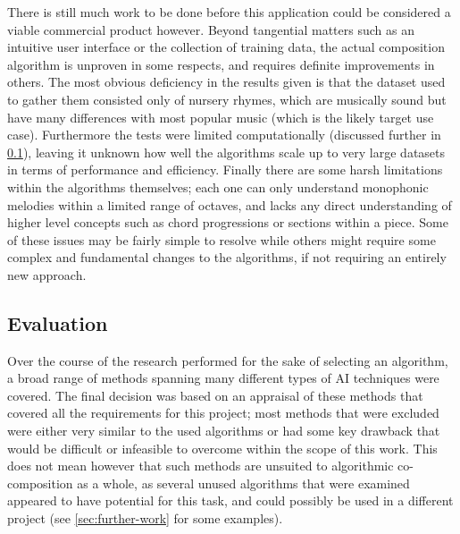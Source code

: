 \documentclass[ author={Stephen Livermore-Tozer},
				supervisor={Dr. Peter Flach},
				degree={MEng},
				title={Algorithmic Co-composition Using Machine Learning},
				subtitle={},
				type={research},
				year={2016} ]{dissertation}
\begin{document}
	There is still much work to be done before this application could be considered a viable commercial product however. Beyond tangential matters such as an intuitive user interface or the collection of training data, the actual composition algorithm is unproven in some respects, and requires definite improvements in others. The most obvious deficiency in the results given is that the dataset used to gather them consisted only of nursery rhymes, which are musically sound but have many differences with most popular music (which is the likely target use case). Furthermore the tests were limited computationally (discussed further in \ref{sec:project-evaluation}), leaving it unknown how well the algorithms scale up to very large datasets in terms of performance and efficiency. Finally there are some harsh limitations within the algorithms themselves; each one can only understand monophonic melodies within a limited range of octaves, and lacks any direct understanding of higher level concepts such as chord progressions or sections within a piece. Some of these issues may be fairly simple to resolve while others might require some complex and fundamental changes to the algorithms, if not requiring an entirely new approach.
	
	\subsection{Evaluation}
	\label{sec:project-evaluation}
	
	Over the course of the research performed for the sake of selecting an algorithm, a broad range of methods spanning many different types of AI techniques were covered. The final decision was based on an appraisal of these methods that covered all the requirements for this project; most methods that were excluded were either very similar to the used algorithms or had some key drawback that would be difficult or infeasible to overcome within the scope of this work. This does not mean however that such methods are unsuited to algorithmic co-composition as a whole, as several unused algorithms that were examined appeared to have potential for this task, and could possibly be used in a different project (see \ref{sec:further-work} for some examples).
	
\end{document}
